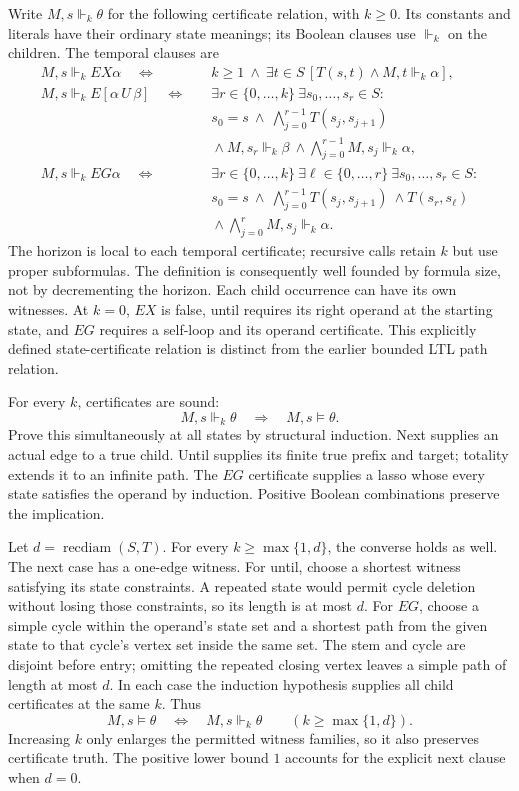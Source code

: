 Write \(M,s\Vdash_k\theta\) for the following certificate
relation, with \(k\geq0\). Its constants and literals
have their ordinary state meanings; its Boolean clauses
use \(\Vdash_k\) on the children. The temporal clauses are
\[
\begin{aligned}
 M,s\Vdash_k EX\alpha
 \quad\Longleftrightarrow\quad&
 k\geq1\ \land\
 \exists t\in S\,[T(s,t)\land M,t\Vdash_k\alpha],\\
 M,s\Vdash_k E[\alpha\,U\,\beta]
 \quad\Longleftrightarrow\quad&
 \exists r\in\{0,\ldots,k\}\ \exists s_0,\ldots,s_r\in S:\\
 &s_0=s\ \land\
   \bigwedge_{j=0}^{r-1}T(s_j,s_{j+1})\\
 &{}\land M,s_r\Vdash_k\beta\
   \land\bigwedge_{j=0}^{r-1}M,s_j\Vdash_k\alpha,\\
 M,s\Vdash_k EG\alpha
 \quad\Longleftrightarrow\quad&
 \exists r\in\{0,\ldots,k\}\
 \exists\ell\in\{0,\ldots,r\}\
 \exists s_0,\ldots,s_r\in S:\\
 &s_0=s\ \land\
   \bigwedge_{j=0}^{r-1}T(s_j,s_{j+1})\
   \land T(s_r,s_\ell)\\
 &{}\land\bigwedge_{j=0}^{r}M,s_j\Vdash_k\alpha.
\end{aligned}
\]
The horizon is local to each temporal certificate;
recursive calls retain \(k\) but use proper subformulas.
The definition is consequently well founded by formula
size, not by decrementing the horizon. Each child
occurrence can have its own witnesses.
At \(k=0\), \(EX\) is false, until requires its right
operand at the starting state, and \(EG\) requires a
self-loop and its operand certificate.
This explicitly defined state-certificate relation
is distinct from the earlier bounded LTL path relation.

For every \(k\), certificates are sound:
\[
 M,s\Vdash_k\theta\quad\Longrightarrow\quad M,s\models\theta.
\]
Prove this simultaneously at all states by structural
induction. Next supplies an actual edge to a true child.
Until supplies its finite true prefix and target;
totality extends it to an infinite path. The \(EG\)
certificate supplies a lasso whose every state satisfies
the operand by induction. Positive Boolean combinations
preserve the implication.

Let \(d=\operatorname{recdiam}(S,T)\). For every
\(k\geq\max\{1,d\}\), the converse holds as well.
The next case has a one-edge witness. For until,
choose a shortest witness satisfying its state constraints.
A repeated state would permit cycle deletion without
losing those constraints, so its length is at most \(d\).
For \(EG\), choose a simple cycle within the operand's
state set and a shortest path from the given state
to that cycle's vertex set inside the same set.
The stem and cycle are disjoint before entry; omitting
the repeated closing vertex leaves a simple path of
length at most \(d\). In each case the induction
hypothesis supplies all child certificates at the
same \(k\). Thus
\[
 M,s\models\theta
 \quad\Longleftrightarrow\quad M,s\Vdash_k\theta
 \qquad(k\geq\max\{1,d\}).
\]
Increasing \(k\) only enlarges the permitted witness
families, so it also preserves certificate truth.
The positive lower bound \(1\) accounts for the explicit
next clause when \(d=0\).

